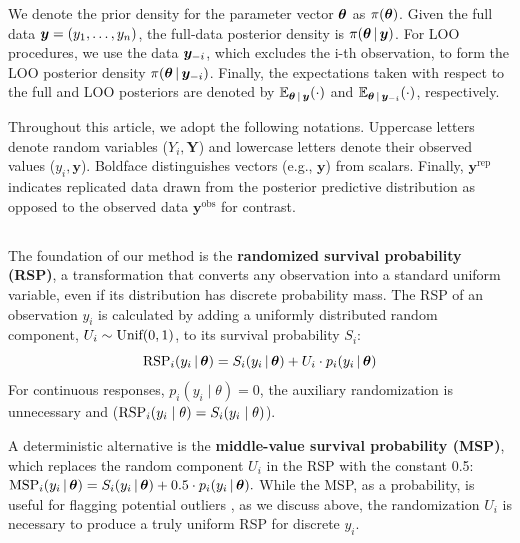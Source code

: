 We denote the prior density for the parameter vector $\bm{\theta}$ as $\pi(\bm{\theta})$.   Given the full data $\bm{y} = (y_1, \dots, y_n)$, the full-data posterior density is $\pi(\bm{\theta} \,|\, \bm{y})$. For LOO procedures, we use the data $\bm{y}_{-i}$, which excludes the i-th observation, to form the LOO posterior density $\pi(\bm{\theta} \,|\, \bm{y}_{-i})$. Finally, the expectations taken with respect to the full and LOO posteriors are denoted by $\mathbb{E}_{\bm{\theta}\,|\,\bm{y}}(\cdot)$ and $\mathbb{E}_{\bm{\theta}\,|\,\bm{y}_{-i}}(\cdot)$, respectively.

Throughout this article, we adopt the following notations. 
Uppercase letters denote random variables ($Y_i, \mathbf{Y}$) 
and lowercase letters denote their observed values ($y_i, \bm{y}$).  Boldface distinguishes vectors (e.g., $\bm{y}$) from scalars.  Finally, $\bm{y}^{\text{rep}}$ indicates replicated data drawn from  the posterior predictive distribution as opposed to the observed data $\bm{y}^{\text{obs}}$ for contrast.

\subsection{}\label{ZRESID1}


The foundation of our method is the \textbf{randomized survival probability (RSP)}, a transformation that converts any observation into a standard uniform variable, even if its distribution has discrete probability mass. The RSP of an observation $y_i$ is calculated by adding a uniformly distributed random component, $U_i \sim \text{Unif}(0,1)$, to its survival probability $S_i$:
\begin{equation}\label{eq:rsp_definition}
\text{RSP}_i(y_i \,|\, \bm{\theta}) = S_i(y_i \,|\, \bm{\theta}) + U_i \cdot p_i(y_i \,|\, \bm{\theta})
\end{equation}
For continuous responses, $p_i(y_i\mid\theta)=0$, the auxiliary randomization is unnecessary and ($\text{RSP}_i(y_i\mid\theta)=S_i(y_i\mid\theta)$).

A deterministic alternative is the \textbf{middle-value survival probability (MSP)}, which replaces the random component $U_i$ in the RSP with the constant 0.5:
$\text{MSP}_i(y_i \,|\,   \bm{\theta}) = S_i(y_i \,|\, \bm{\theta}) + 0.5 \cdot p_i(y_i \,|\, \bm{\theta}).$
While the MSP,  as a probability, is useful for flagging potential outliers \citep{marshall_identifying_2007, li_estimating_2017}, as we discuss above, the randomization $U_i$ is necessary to produce a truly uniform RSP for discrete $y_i$. 

